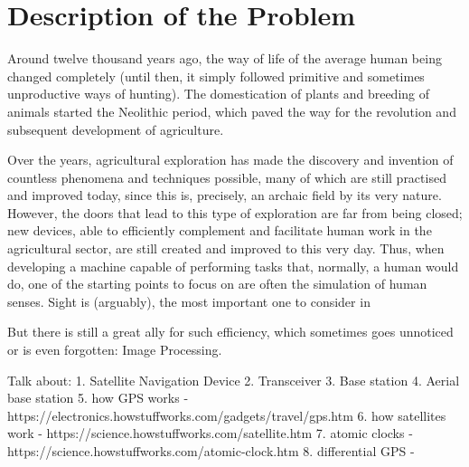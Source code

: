 




\chapter{Description of the Problem}\label{cha:introduction_description}

Around twelve thousand years ago, the way of life of the average human being changed completely (until then, it simply followed primitive and sometimes unproductive ways of hunting). The domestication of plants and breeding of animals started the Neolithic period, which paved the way for the revolution and subsequent development of agriculture. %

Over the years, agricultural exploration has made the discovery and invention of countless phenomena and techniques possible, many of which are still practised and improved today, since this is, precisely, an archaic field by its very nature.
However, the doors that lead to this type of exploration are far from being closed; new devices, able to efficiently complement and facilitate human work in the agricultural sector, are still created and improved to this very day. Thus, when developing a machine capable of performing tasks that, normally, a human would do, one of the starting points to focus on are often the simulation of human senses. Sight is (arguably), the most important one to consider in 

But there is still a great ally for such efficiency, which sometimes goes unnoticed or is even forgotten: Image Processing.



Talk about:
    1. Satellite Navigation Device
    2. Transceiver
    3. Base station
    4. Aerial base station
    5. how GPS works - https://electronics.howstuffworks.com/gadgets/travel/gps.htm
    6. how satellites work - https://science.howstuffworks.com/satellite.htm
    7. atomic clocks - https://science.howstuffworks.com/atomic-clock.htm
    8. differential GPS - 

